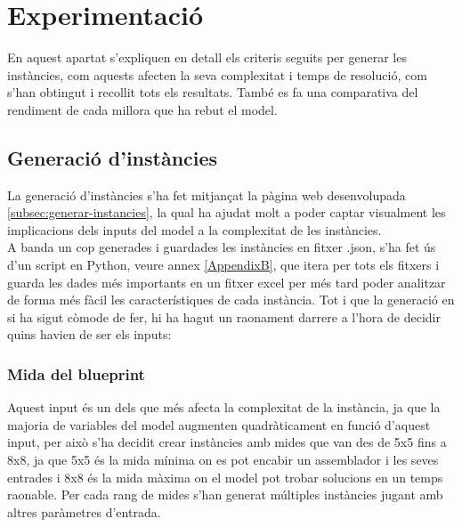 


\chapter{Experimentació} %

\label{Experimentació} %
En aquest apartat s'expliquen en detall els criteris seguits per generar les instàncies, com aquests afecten la seva complexitat i temps de resolució, com s'han obtingut i recollit tots els resultats. També es fa una comparativa del rendiment de cada millora que ha rebut el model.

\section{Generació d'instàncies}
La generació d'instàncies s'ha fet mitjançat la pàgina web desenvolupada \ref{subsec:generar-instancies}, la qual ha ajudat molt a poder captar visualment les implicacions dels inputs del model a la complexitat de les instàncies.\\
A banda un cop generades i guardades les instàncies en fitxer .json, s'ha fet ús d'un script en Python, veure annex \ref{AppendixB}, que itera per tots els fitxers i guarda les dades més importants en un fitxer excel per més tard poder analitzar de forma més fàcil les característiques de cada instància.
Tot i que la generació en si ha sigut còmode de fer, hi ha hagut un raonament darrere a l'hora de decidir quins havien de ser els inputs:

\subsection{Mida del blueprint}
Aquest input és un dels que més afecta la complexitat de la instància, ja que la majoria de variables del model augmenten quadràticament en funció d'aquest input, per això s'ha decidit crear instàncies amb mides que van des de 5x5 fins a 8x8, ja que 5x5 és la mida mínima on es pot encabir un assemblador i les seves entrades i 8x8 és la mida màxima on el model pot trobar solucions en un temps raonable. Per cada rang de mides s'han generat múltiples instàncies jugant amb altres paràmetres d'entrada.


